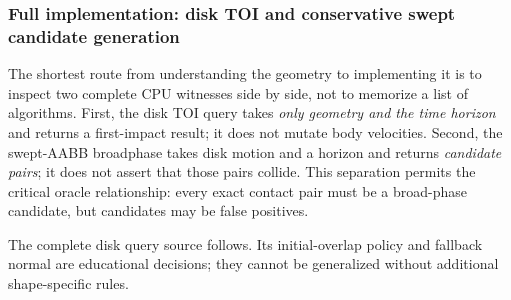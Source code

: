 \subsubsection{Full implementation: disk TOI and conservative swept candidate generation}\label{04-visual-computing-ii-ch026-full-implementation-disk-toi-and-conservative-swept-candidate-generation}

The shortest route from understanding the geometry to implementing it is to inspect two complete CPU witnesses side by side, not to memorize a list of algorithms. First, the disk TOI query takes \emph{only geometry and the time horizon} and returns a first-impact result; it does not mutate body velocities. Second, the swept-AABB broadphase takes disk motion and a horizon and returns \emph{candidate pairs}; it does not assert that those pairs collide. This separation permits the critical oracle relationship: every exact contact pair must be a broad-phase candidate, but candidates may be false positives.

The complete disk query source follows. Its initial-overlap policy and fallback normal are educational decisions; they cannot be generalized without additional shape-specific rules.

